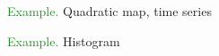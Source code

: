 \documentclass[
    xcolor={svgnames,dvipsnames},
    hyperref={colorlinks, citecolor=DeepPink4, linkcolor=DarkRed, urlcolor=DarkBlue}
    ]{beamer}  %
\newcommand{\Eg}{\textcolor{ForestGreen}{Example. }}
\newcommand{\1}{\mathbbm 1}
\begin{document}
\begin{frame}
    
    
    \Eg Quadratic map, time series

    \begin{figure}
        \centering
    \end{figure}


\end{frame}


\begin{frame}
    
    
    \Eg Histogram

    \begin{figure}
        \centering
    \end{figure}


\end{frame}
\end{document}
